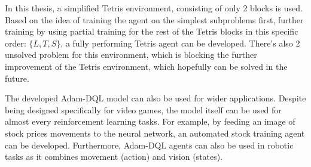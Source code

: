 		\par
		In this thesis, a simplified Tetris environment, consisting of only 2 blocks is used. Based on the idea of training the agent on the simplest subproblems first, further training by using partial training for the rest of the Tetris blocks in this specific order: $\{L,T,S\}$, a fully performing Tetris agent can be developed. There's also 2 unsolved problem for this environment, which is blocking the further improvement of the Tetris environment, which hopefully can be solved in the future.
		\par
		The developed Adam-DQL model can also be used for wider applications. Despite being designed specifically for video games, the model itself can be used for almost every reinforcement learning tasks. For example, by feeding an image of stock prices movements to the neural network, an automated stock training agent can be developed. Furthermore, Adam-DQL agents can also be used in robotic tasks as it combines movement (action) and vision (states). 
		